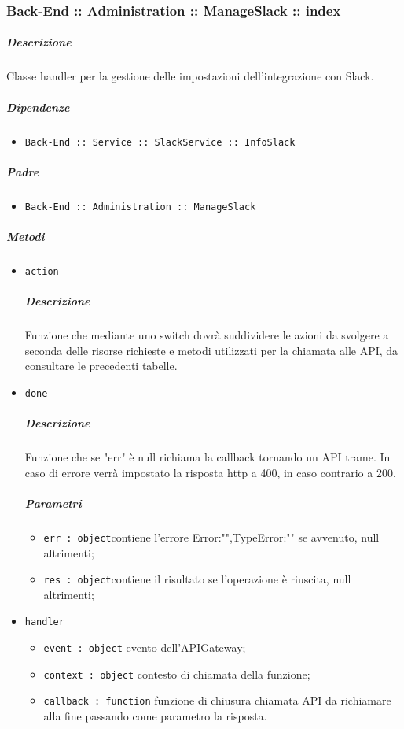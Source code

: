 \documentclass[../ManualeSviluppatore_v1.0.0.tex]{subfiles}
\begin{document}
\subsubsection{Back-End :: Administration :: ManageSlack :: index}
\subparagraph{Descrizione} Classe handler per la gestione delle impostazioni dell'integrazione con Slack.
\subparagraph{Dipendenze}
\begin{itemize}
	\item \texttt{Back-End :: Service :: SlackService :: InfoSlack}
\end{itemize}
\subparagraph{Padre}
\begin{itemize}
	\item \texttt{Back-End :: Administration :: ManageSlack}
\end{itemize}
\subparagraph{Metodi}
\begin{itemize}
	\item \texttt{action}
	      \subparagraph{Descrizione} Funzione che mediante uno switch dovrà suddividere le azioni da svolgere a seconda delle risorse richieste e metodi utilizzati per la chiamata alle API, da consultare le precedenti tabelle.
	\item \texttt{done}
	      \subparagraph{Descrizione} Funzione che se "err" è null richiama la callback tornando un API trame. In caso di errore verrà impostato la risposta http a 400, in caso contrario a 200.
	      \subparagraph{Parametri}
	      \begin{itemize}
	      	\item \texttt{err : object}contiene l'errore {Error:"",TypeError:""} se avvenuto, null altrimenti;
	      	\item \texttt{res : object}contiene il risultato se l'operazione è riuscita, null altrimenti;
	      \end{itemize}
	\item \texttt{handler}
	      \begin{itemize}
	      	\item \texttt{event : object} evento dell'APIGateway;
	      	\item \texttt{context : object} contesto di chiamata della funzione;
	      	\item \texttt{callback : function} funzione di chiusura chiamata API da richiamare alla fine passando come parametro la risposta.
	      \end{itemize}
\end{itemize}
\end{document}
